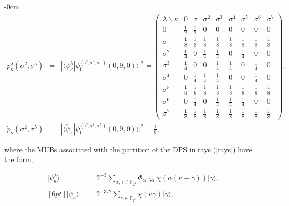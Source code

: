 \documentclass[quantumrep,article,submit,pdftex,moreauthors]{Definitions/mdpi}
\DeclareMathOperator{\tr}{tr}
\begin{document}
\begin{adjustwidth}{-\extralength}{0cm}
\begin{eqnarray}
  p_{\kappa }^{\lambda }\left(\sigma^{2}, \sigma^{5}\right)
  &=& |\langle\psi_{\kappa }^{\lambda }
  |\psi_{0}^{(\beta ;\sigma ^{2},\sigma^{5})}(0,9,0)\rangle|^{2}
  = \left(\begin{array}{ccccccccc}
    \lambda \backslash \kappa  & 0 & \sigma  & \sigma ^{2} & \sigma ^{3} &
    \sigma ^{4} & \sigma ^{5} & \sigma ^{6} & \sigma ^{7} \\ 
    0 & \frac{1}{2} & \frac{1}{2} & 0 & 0 & 0 & 0 & 0 & 0 \\ [6pt]
    \sigma & \frac{1}{8} & \frac{1}{8} & \frac{1}{8} & \frac{1}{8} &
    \frac{1}{8} & \frac{1}{8} & \frac{1}{8} & \frac{1}{8} \\  [6pt]
    \sigma^{2} & \frac{1}{4} & 0 & \frac{1}{4} & \frac{1}{4} & 0 &
    \frac{1}{4} & 0 & 0 \\  [6pt]
    \sigma^{3} & \frac{1}{4} & 0 & 0 & \frac{1}{4} & \frac{1}{4} & 0 &
    \frac{1}{4} & 0 \\  [6pt]
    \sigma^{4} & 0 & \frac{1}{4} & \frac{1}{4} & \frac{1}{4} & 0 & 0 &
    \frac{1}{4} & 0 \\  [6pt]
    \sigma^{5} & \frac{1}{8} & \frac{1}{8} & \frac{1}{8} & \frac{1}{8} &
    \frac{1}{8} & \frac{1}{8} & \frac{1}{8} & \frac{1}{8} \\  [6pt]
    \sigma^{6} & 0 & \frac{1}{4} & 0 & \frac{1}{4} & \frac{1}{4} &
    \frac{1}{4} & 0 & 0 \\  [6pt]
    \sigma^{7} & \frac{1}{8} & \frac{1}{8} & \frac{1}{8} & \frac{1}{8} &
    \frac{1}{8} & \frac{1}{8} & \frac{1}{8} & \frac{1}{8}
  \end{array}\right), \\
  \tilde{p}_{\kappa }(\sigma^{2},\sigma^{5})
  &=& |\langle \tilde\psi_\kappa | \psi_0^{(\beta;\sigma^2,\sigma^5)}(0,9,0)\rangle|^2
  = \frac{1}{8},%
\end{eqnarray}
\end{adjustwidth}

where the MUBs associated with the partition of the DPS in rays (\ref{rays})
have the form,

\begin{eqnarray}
  |\psi_{\kappa }^{\lambda }\rangle
  &=& 2^{-3} \sum_{\alpha,\gamma \in \mathbb{F}_{2^{3}}}
  \Phi_{\alpha,\lambda \alpha} \;
  \chi\left( \alpha(\kappa+\gamma) \right) 
  |\gamma \rangle,
  \label{explicit eigs} \\ [6pt]
  |\tilde{\psi}_{\kappa }\rangle
  &=& 2^{-3 / 2} \sum_{\gamma \in \mathbb{F}_{2^{3}}}
  \chi\left( \kappa\gamma \right) 
  |\gamma \rangle,
  \label{explicit eigf}
\end{eqnarray}
\end{document}
